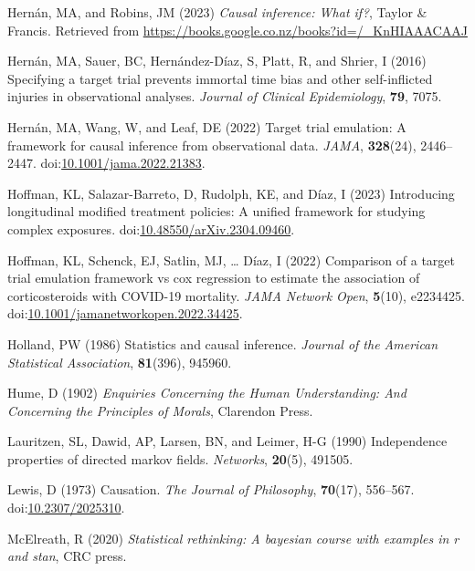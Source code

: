 \documentclass[
  singlecolumn,
  9pt]{article}
\begin{document}
\begin{CSLReferences}
Hernán, MA, and Robins, JM (2023) \emph{Causal inference: What if?},
Taylor \& Francis. Retrieved from
\url{https://books.google.co.nz/books?id=/_KnHIAAACAAJ}

Hernán, MA, Sauer, BC, Hernández-Díaz, S, Platt, R, and Shrier, I (2016)
Specifying a target trial prevents immortal time bias and other
self-inflicted injuries in observational analyses. \emph{Journal of
Clinical Epidemiology}, \textbf{79}, 7075.

Hernán, MA, Wang, W, and Leaf, DE (2022) Target trial emulation: A
framework for causal inference from observational data. \emph{JAMA},
\textbf{328}(24), 2446--2447.
doi:\href{https://doi.org/10.1001/jama.2022.21383}{10.1001/jama.2022.21383}.

Hoffman, KL, Salazar-Barreto, D, Rudolph, KE, and Díaz, I (2023)
Introducing longitudinal modified treatment policies: A unified
framework for studying complex exposures.
doi:\href{https://doi.org/10.48550/arXiv.2304.09460}{10.48550/arXiv.2304.09460}.

Hoffman, KL, Schenck, EJ, Satlin, MJ, \ldots{} Díaz, I (2022) Comparison
of a target trial emulation framework vs cox regression to estimate the
association of corticosteroids with COVID-19 mortality. \emph{JAMA
Network Open}, \textbf{5}(10), e2234425.
doi:\href{https://doi.org/10.1001/jamanetworkopen.2022.34425}{10.1001/jamanetworkopen.2022.34425}.

Holland, PW (1986) Statistics and causal inference. \emph{Journal of the
American Statistical Association}, \textbf{81}(396), 945960.

Hume, D (1902) \emph{Enquiries Concerning the Human Understanding: And
Concerning the Principles of Morals}, Clarendon Press.

Lauritzen, SL, Dawid, AP, Larsen, BN, and Leimer, H-G (1990)
Independence properties of directed markov fields. \emph{Networks},
\textbf{20}(5), 491505.

Lewis, D (1973) Causation. \emph{The Journal of Philosophy},
\textbf{70}(17), 556--567.
doi:\href{https://doi.org/10.2307/2025310}{10.2307/2025310}.

McElreath, R (2020) \emph{Statistical rethinking: A bayesian course with
examples in r and stan}, CRC press.


\end{CSLReferences}
\end{document}
